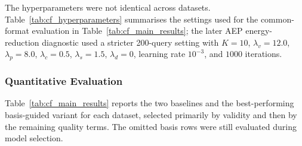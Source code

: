 \documentclass[runningheads]{llncs}
\begin{document}
	The hyperparameters were not identical across datasets. Table~\ref{tab:cf_hyperparameters} summarises the settings used for the common-format evaluation in Table~\ref{tab:cf_main_results}; the later AEP energy-reduction diagnostic used a stricter 200-query setting with $K=10$, $\lambda_v=12.0$, $\lambda_p=8.0$, $\lambda_c=0.5$, $\lambda_s=1.5$, $\lambda_d=0$, learning rate $10^{-3}$, and $1000$ iterations.
	
	\begin{table}[t]
		\centering
		\caption{Counterfactual generation settings used in the common-format evaluation. The loss tuple is $(\lambda_v,\lambda_p,\lambda_c,\lambda_g,\lambda_s,\lambda_d)$.}
		\label{tab:cf_hyperparameters}
	\end{table}
	
	\subsubsection{Quantitative Evaluation}
	Table~\ref{tab:cf_main_results} reports the two baselines and the best-performing basis-guided variant for each dataset, selected primarily by validity and then by the remaining quality terms. The omitted basis rows were still evaluated during model selection.
	
\end{document}
